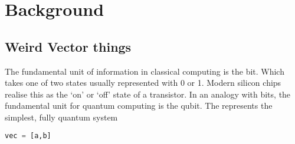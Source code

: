 \chapter{Background}

\section{Weird Vector things}\label{TheBasics}
The fundamental unit of information in classical computing is the bit. Which takes one of two states usually represented with 0 or 1. Modern silicon chips realise this as the `on' or `off' state of a transistor. In an analogy with bits, the fundamental unit for quantum computing is the qubit. The represents the simplest, fully quantum system 

\begin{lstlisting}[language=Python]
vec = [a,b]
\end{lstlisting}
